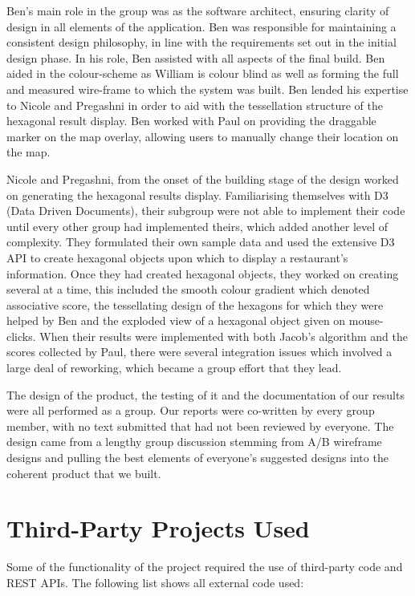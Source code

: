 \documentclass[10pt,a4paper]{article}
\begin{document}
Ben’s main role in the group was as the software architect, ensuring clarity of design in all elements of the application. Ben was responsible for maintaining a consistent design philosophy, in line with the requirements set out in the initial design phase. In his role, Ben assisted with all aspects of the final build. Ben aided in the colour-scheme as William is colour blind as well as forming the full and measured wire-frame to which the system was built. Ben lended his expertise to Nicole and Pregashni in order to aid with the tessellation structure of the hexagonal result display. Ben worked with Paul on providing the draggable marker on the map overlay, allowing users to manually change their location on the map.

Nicole and Pregashni, from the onset of the building stage of the design worked on generating the hexagonal results display. Familiarising themselves with D3 (Data Driven Documents), their subgroup were not able to implement their code until every other group had implemented theirs, which added another level of complexity. They formulated their own sample data and used the extensive D3 API to create hexagonal objects upon which to display a restaurant's information. Once they had created hexagonal objects, they worked on creating several at a time, this included the smooth colour gradient which denoted associative score, the tessellating design of the hexagons for which they were helped by Ben and the exploded view of a hexagonal object given on mouse-clicks. When their results were implemented with both Jacob’s algorithm and the scores collected by Paul, there were several integration issues which involved a large deal of reworking, which became a group effort that they lead. 

The design of the product, the testing of it and the documentation of our results were all performed as a group. Our reports were co-written by every group member, with no text submitted that had not been reviewed by everyone. The design came from a lengthy group discussion stemming from A/B wireframe designs and pulling the best elements of everyone’s suggested designs into the coherent product that we built.


\section*{Third-Party Projects Used}

Some of the functionality of the project required the use of third-party code and REST APIs. The following list shows all external code used:
\end{document}
